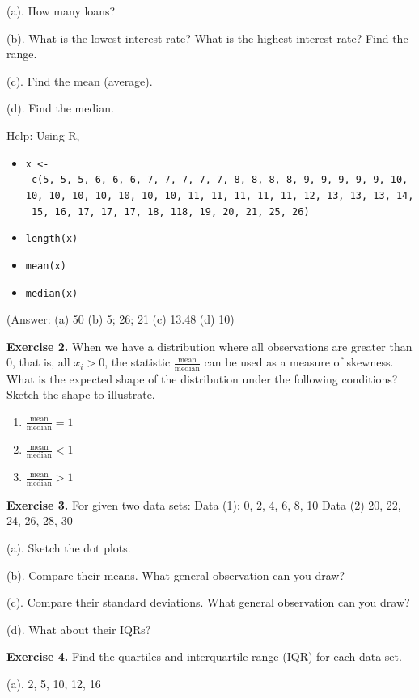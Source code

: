 \documentclass[
]{book}
\begin{document}
(a). How many loans?

(b). What is the lowest interest rate? What is the highest interest rate? Find the range.

(c). Find the mean (average).

(d). Find the median.

Help: Using R,

\begin{itemize}
\item
  \texttt{x\ \textless{}-\ c(5,\ 5,\ 5,\ 6,\ 6,\ 6,\ 7,\ 7,\ 7,\ 7,\ 7,\ 8,\ 8,\ 8,\ 8,\ 9,\ 9,\ 9,\ 9,\ 9,\ 10,\ 10,\ 10,\ 10,\ 10,\ 10,\ 10,\ 10,\ 11,\ 11,\ 11,\ 11,\ 11,\ 12,\ 13,\ 13,\ 13,\ 14,\ 15,\ 16,\ 17,\ 17,\ 17,\ 18,\ 118,\ 19,\ 20,\ 21,\ 25,\ 26)}
\item
  \texttt{length(x)}
\item
  \texttt{mean(x)}
\item
  \texttt{median(x)}
\end{itemize}

(Answer: (a) 50 (b) 5; 26; 21 (c) 13.48 (d) 10)

\textbf{Exercise 2.} When we have a distribution where all observations are greater than 0, that is, all \(x_i > 0\), the statistic \(\frac{\text{mean}}{\text{median}}\) can be used as a measure of skewness. What is the expected shape of the distribution under the following conditions? Sketch the shape to illustrate.

\begin{enumerate}
\def\labelenumi{(\alph{enumi})}
\item
  \(\frac{\text{mean}}{\text{median}} = 1\)
\item
  \(\frac{\text{mean}}{\text{median}} < 1\)
\item
  \(\frac{\text{mean}}{\text{median}} > 1\)
\end{enumerate}

\textbf{Exercise 3.} For given two data sets: Data (1): 0, 2, 4, 6, 8, 10 Data (2) 20, 22, 24, 26, 28, 30

(a). Sketch the dot plots.

(b). Compare their means. What general observation can you draw?

(c). Compare their standard deviations. What general observation can you draw?

(d). What about their IQRs?

\textbf{Exercise 4.} Find the quartiles and interquartile range (IQR) for each data set.

(a). 2, 5, 10, 12, 16
\end{document}
